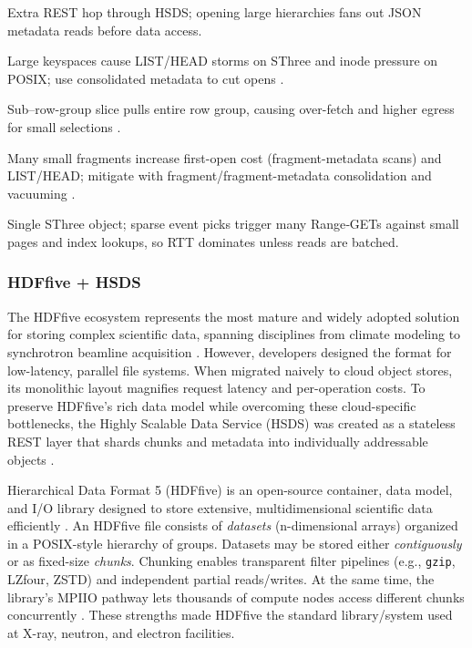 \documentclass[nomenclature, english, bibtex]{kththesis}
\numberwithin{listing}{chapter}
\begin{document}
\begin{table}[htbp]
\begin{threeparttable}
\begin{tablenotes}[flushleft]
      \item[b] Extra REST hop through \gls{HSDS}; opening large hierarchies fans out \gls{JSON} metadata reads before data access.
      \item[c] Large keyspaces cause LIST/HEAD storms on \gls{SThree} and inode pressure on \gls{POSIX}; use consolidated metadata to cut opens \cite{kang2020predicting}.
      \item[d] Sub–row-group slice pulls entire row group, causing over-fetch and higher egress for small selections \cite{vohra2016apache}.
      \item[e] Many small fragments increase first-open cost (fragment-metadata scans) and LIST/HEAD; mitigate with fragment/fragment-metadata consolidation and vacuuming \cite{TileDBConsolidateFragmentMeta}.
      \item[f] Single \gls{SThree} object; sparse event picks trigger many Range‐GETs against small pages and index lookups, so RTT dominates unless reads are batched.
    \end{tablenotes}
  \end{threeparttable}
\end{table}

\subsubsection{\texorpdfstring{\gls{HDFfive} + \gls{HSDS}}{HDF5 + HSDS}}
\label{sec:hdf5-hsds}
The \gls{HDFfive} ecosystem represents the most mature and widely adopted solution for storing complex scientific data, spanning disciplines from climate modeling to synchrotron beamline acquisition \cite{10.1145/1966895.1966900}. However, developers designed the format for low-latency, parallel file systems. When migrated naively to cloud object stores, its monolithic layout magnifies request latency and per-operation costs. To preserve \gls{HDFfive}’s rich data model while overcoming these cloud-specific bottlenecks, the Highly Scalable Data Service (\gls{HSDS}) was created as a stateless REST layer that shards chunks and metadata into individually addressable objects \cite{readey2020hsds}.

Hierarchical Data Format 5 (\gls{HDFfive}) is an open-source container, data model, and I/O library designed to store extensive, multidimensional scientific data efficiently \cite{10.1145/1966895.1966900}. An \gls{HDFfive} file consists of \emph{datasets} (n-dimensional arrays) organized in a \gls{POSIX}-style hierarchy of groups. Datasets may be stored either \emph{contiguously} or as fixed-size \emph{chunks}. Chunking enables transparent filter pipelines (e.g., \texttt{gzip}, \gls{LZfour}, \gls{ZSTD}) and independent partial reads/writes. At the same time, the library’s \gls{MPIIO} pathway lets thousands of compute nodes access different chunks concurrently \cite{hdf5_chunking}. These strengths made \gls{HDFfive} the standard library/system used at X-ray, neutron, and electron facilities.
\end{document}
